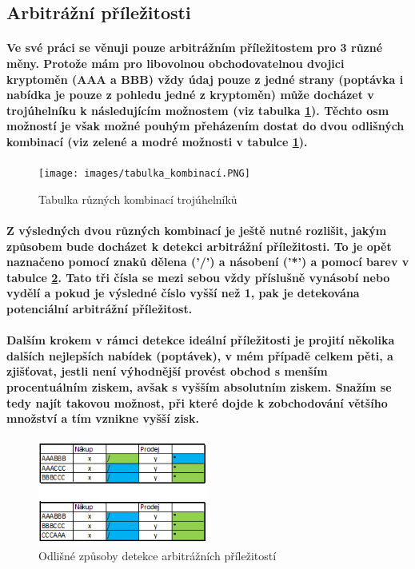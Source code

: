 \documentclass[thesis=B,czech]{FITthesis}[2019/03/21]
\begin{document}
\subsection{Arbitrážní příležitosti}
\paragraph{
Ve své práci se věnuji pouze arbitrážním příležitostem pro 3 různé měny. Protože mám pro libovolnou obchodovatelnou dvojici kryptoměn (AAA a BBB) vždy údaj pouze z jedné strany (poptávka i nabídka je pouze z pohledu jedné z kryptoměn) může docházet v trojúhelníku k následujícím možnostem (viz tabulka \ref{tabulka_kombinaci}). Těchto osm možností je však možné pouhým přeházením dostat do dvou odlišných kombinací (viz zelené a modré možnosti v tabulce \ref{tabulka_kombinaci}).
}
\begin{figure}\centering
	\texttt{[image: images/tabulka\_kombinací.PNG]}
	\caption{Tabulka různých kombinací trojúhelníků}\label{tabulka_kombinaci}
\end{figure}
\paragraph{
Z výsledných dvou různých kombinací je ještě nutné rozlišit, jakým způsobem bude docházet k detekci arbitrážní příležitosti. To je opět naznačeno pomocí znaků dělena ('/') a násobení ('*') a pomocí barev v tabulce \ref{2_kombinace}. Tato tři čísla se mezi sebou vždy příslušně vynásobí nebo vydělí a pokud je výsledné číslo vyšší než 1, pak je detekována potenciální arbitrážní příležitost. 
}
\paragraph{
Dalším krokem v rámci detekce ideální příležitosti je projití několika dalších nejlepších nabídek (poptávek), v mém případě celkem pěti, a zjišťovat, jestli není výhodnější provést obchod s menším procentuálním ziskem, avšak s vyšším absolutním ziskem. Snažím se tedy najít takovou možnost, při které dojde k zobchodování většího množství a tím vznikne vyšší zisk.
}
\begin{figure}\centering
	\includegraphics[width=0.5\textwidth]{images/2_kombinace.PNG}
	\caption{Odlišné způsoby detekce arbitrážních příležitostí}\label{2_kombinace}
\end{figure}
\end{document}

